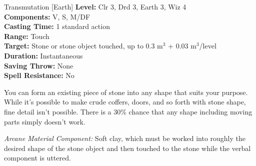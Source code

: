 {Transmutation [Earth]}
{
	\textbf{Level:}
	Clr 3, Drd 3, Earth 3, Wiz 4\\
	\textbf{Components:}
	V, S, M/DF\\
	\textbf{Casting Time:}
	1 standard action\\
	\textbf{Range:}
	Touch\\
	\textbf{Target:}
	Stone or stone object touched, up to 0.3 m$^3$ + 0.03 m$^3$/level\\
	\textbf{Duration:}
	Instantaneous\\
	\textbf{Saving Throw:}
	None\\
	\textbf{Spell Resistance:}
	No\\
}
{
	You can form an existing piece of stone into any shape that suits your purpose. While it's possible to make crude coffers, doors, and so forth with stone shape, fine detail isn't possible. There is a 30\% chance that any shape including moving parts simply doesn't work.

	\textit{Arcane Material Component:}
	Soft clay, which must be worked into roughly the desired shape of the stone object and then touched to the stone while the verbal component is uttered.

}
